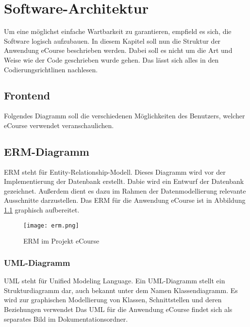 \chapter{Software-Architektur}

Um eine möglichst einfache Wartbarkeit zu garantieren, empfield es sich, die Software logisch aufzubauen. In diesem Kapitel soll nun die Struktur der Anwendung eCourse beschrieben werden. Dabei soll es nicht um die Art und Weise wie der Code geschrieben wurde gehen. Das lässt sich alles in den Codierungsrichtlinen nachlesen.

\section{Frontend}

Folgendes Diagramm soll die verschiedenen Möglichkeiten des Benutzers, welcher eCourse verwendet veranschaulichen. 

\section{ERM-Diagramm}
ERM steht für Entity-Relationship-Modell. Dieses Diagramm wird vor der Implementierung der Datenbank erstellt. Dabie wird ein Entwurf der Datenbank gezeichnet. Außerdem dient es dazu im Rahmen der Datenmodellierung relevante Ausschnitte darzustellen. Das ERM für die Anwendung eCourse ist in Abbildung \ref{fib:erm} graphisch aufbereitet.

\begin{figure}[H]
\centering
\texttt{[image: erm.png]}
\caption{ERM im Projekt eCourse}
\label{fib:erm}
\end{figure}

\subsection{UML-Diagramm}
UML steht für Unified Modeling Language. Ein UML-Diagramm stellt ein Strukturdiagramm dar, auch bekannt unter dem Namen Klassendiagramm. Es wird zur graphischen Modellierung von Klassen, Schnittstellen und deren Beziehungen verwendet \newline
Das UML für die Anwendung eCourse findet sich als separates Bild im Dokumentationsordner.